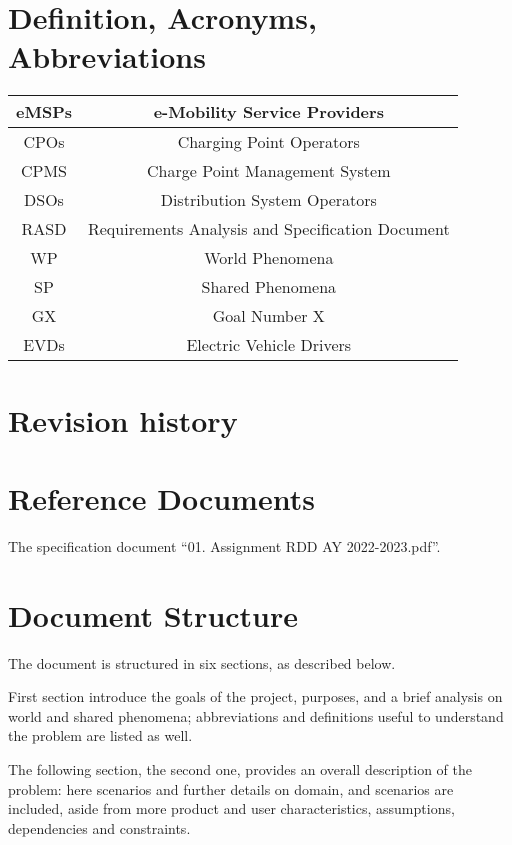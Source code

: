 \documentclass{Configuration_Files/PoliMi3i_thesis}
\begin{document}
    \section{Definition, Acronyms, Abbreviations}\label{sec:definition_acronyms_abbreviations}
	\begin{tabular}{ |c|c| } 
		\hline
		eMSPs & e-Mobility Service Providers\\
		\hline
		CPOs & Charging Point Operators\\ 
		\hline
		CPMS & Charge Point Management System\\ 
		\hline
		DSOs & Distribution System Operators\\ 
		\hline
		RASD & Requirements Analysis and Specification Document\\
		\hline
		WP & World Phenomena\\
		\hline
		SP & Shared Phenomena\\
		\hline
		GX & Goal Number X\\
		\hline
		EVDs & Electric Vehicle Drivers\\
		\hline
	\end{tabular}

    \section{Revision history}\label{sec:revision_history}


    \section{Reference Documents}\label{sec:reference_documents}
	The specification document “01. Assignment RDD AY 2022-2023.pdf”.

    \section{Document Structure}\label{sec:document_structure}
	The document is structured in six sections, as described below.
	
	First section introduce the goals of the project, purposes, and a brief analysis on world and shared phenomena; abbreviations and definitions useful to understand the problem are listed as well. 
	
	The following section, the second one, provides an overall description of the problem: here scenarios and further details on domain, and scenarios are included, aside from more product and user characteristics, assumptions, dependencies and constraints.
	
\end{document}
